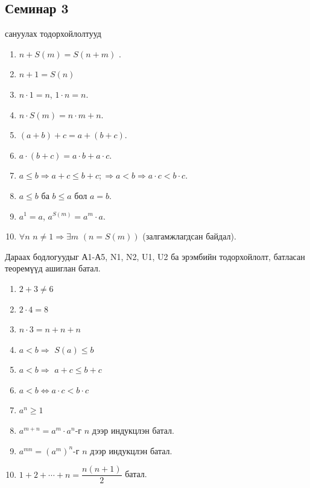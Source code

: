 \subsection{Семинар 3}
сануулах тодорхойлолтууд
\begin{enumerate}
  \item $n+S(m)=S(n+m)$ .
  \item $n+1=S(n)$
  \item $n\cdot 1=n$, $1\cdot n=n$.
  \item $n\cdot S(m)=n\cdot m+n$.
  \item $(a+b)+c=a+(b+c)$.
  \item $a\cdot(b+c)=a\cdot b+a\cdot c$.
  \item $a\le b\Rightarrow a+c\le b+c; \Rightarrow a<b\Rightarrow a\cdot c<b\cdot c$.
  \item $a\leq b$ ба $b\leq a$ бол $a=b$.
  \item $a^1=a$, $a^{S(m)}=a^m\cdot a$.
  \item $\forall n\,\, n\ne 1\Rightarrow\exists m\,\,(n=S(m))$ (залгамжлагдсан байдал).
  \end{enumerate}
  Дараах бодлогуудыг А1-А5, N1, N2, U1, U2 ба эрэмбийн тодорхойлолт, батласан теоремүүд ашиглан батал.
  \begin{enumerate}
  \item $2+3\neq 6$
  \item $2\cdot 4=8$
  \item $n\cdot 3=n+n+n$
  \item $a<b \Rightarrow$ $S(a)\leq b$
  \item $a<b \Rightarrow$ $a+c\leq b+c$
  \item $a<b\Leftrightarrow a\cdot c< b\cdot c$
  \item $a^n\geq 1$ 
  \item $a^{m+n}=a^m\cdot a^n$-г $n$ дээр индукцлэн батал.
  \item $a^{mn}=(a^m)^n$-г $n$ дээр индукцлэн батал.
  \item $1+2+\cdots+n=\dfrac{n(n+1)}{2}$ батал. 
  
\end{enumerate}

